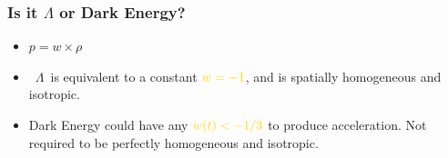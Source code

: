 \documentclass{beamer}
\newcommand{\glambda}{\mbox{{\color{brightred} $\Lambda$}}}
\begin{document}
\frame
{
    \frametitle{Is it {\color{gold} $\Lambda$} or Dark Energy?}


    \begin{itemize}

        \item $p = w \times \rho$

        \item \glambda\ is equivalent to a constant ${\color{gold}w = -1}$,
            and is spatially homogeneous and isotropic.

        \item Dark Energy could have any ${\color{gold} w(t) < -1/3}$ to
            produce acceleration.  Not required to be perfectly homogeneous
            and isotropic.

    \end{itemize}
}
\end{document}
